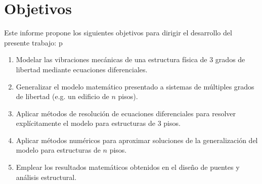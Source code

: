 \section{Objetivos}

Este informe propone los siguientes objetivos para dirigir el desarrollo del presente trabajo:
p
\begin{enumerate}
    \item Modelar las vibraciones mecánicas de una estructura física de 3 grados de libertad mediante ecuaciones diferenciales.
    \item Generalizar el modelo matemático presentado a sistemas de múltiples grados de libertad (e.g. un edificio de \(n\) pisos).
    \item Aplicar métodos de resolución de ecuaciones diferenciales para resolver explícitamente el modelo para estructuras de 3 pisos.
    \item Aplicar métodos numéricos para aproximar soluciones de la generalización del modelo para estructuras de \(n\) pisos.
    \item Emplear los resultados matemáticos obtenidos en el diseño de puentes y análisis estructural.
\end{enumerate}